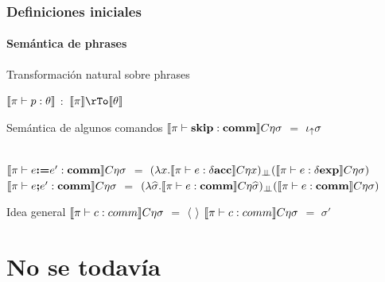 \documentclass{beamer} %
\begin{document}
\begin{frame}
\frametitle{Definiciones iniciales}
\framesubtitle{Sem\'antica de phrases}

\begin{block}{Transformaci\'on natural sobre phrases}

$\llbracket \pi \vdash p : \theta \rrbracket$ $:$ $\semBrcks{\pi} \rTo \semBrcks{\theta}$

\end{block}

\begin{block}{Sem\'antica de algunos comandos}\small
$\llbracket  \pi \vdash \textbf{skip} : \textbf{comm}  \rrbracket C\eta\sigma$ 
$=$ $\iota_{\uparrow} \sigma$\\
\
			
$\llbracket  \pi \vdash e \textbf{:=} e' : \textbf{comm}  \rrbracket C\eta\sigma$ 
$=$ $(\lambda x . \llbracket \pi \vdash e : \delta \textbf{acc} \rrbracket C\eta x)_{\bot \!\!\! \bot}
(\llbracket  \pi \vdash e : \delta \textbf{exp}  \rrbracket C\eta\sigma)$\\


$\llbracket  \pi \vdash e \textbf{;} e' : \textbf{comm}  \rrbracket C\eta\sigma$ 
$=$ $(\lambda \widehat{\sigma} . \llbracket \pi \vdash e : \textbf{comm} \rrbracket C\eta\widehat{\sigma})_{\bot \!\!\! \bot}
(\llbracket  \pi \vdash e : \textbf{comm} \rrbracket C\eta\sigma)$\\

\end{block}

\end{frame}

\begin{frame}
\begin{block}{Idea general}
$\llbracket \pi \vdash c : comm \rrbracket C\eta\sigma$ $=$ $\langle  \  \rangle$
$\llbracket \pi \vdash c : comm \rrbracket C\eta\sigma$ $=$ $\sigma'$
\end{block}
\end{frame}

\section{No se todav\'ia}
\end{document}
